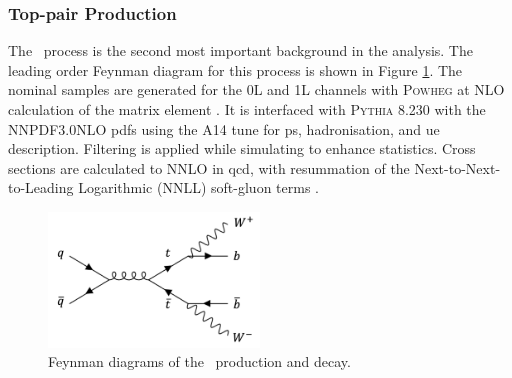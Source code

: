 \subsubsection{Top-pair Production}\label{subsec-vh-top-samples}
The \ttb\ process is the second most important background in the analysis. The leading order Feynman diagram for this process is shown in Figure \ref{fig:feynttb}. The nominal samples are generated for the 0L and 1L channels with \textsc{Powheg} at NLO calculation of the matrix element \cite{StefanoFrixione_2007, PaoloNason_2004}. It is interfaced with \textsc{Pythia} 8.230 with the NNPDF3.0NLO \glspl{pdf} using the A14 tune for \gls{ps}, hadronisation, and \gls{ue} description. Filtering is applied while simulating to enhance statistics. Cross sections are calculated to NNLO in \gls{qcd}, with resummation of the Next-to-Next-to-Leading Logarithmic (NNLL) soft-gluon terms \cite{CZAKON20142930}.

\begin{figure}[h!]
  \center
  \includegraphics[width=0.5\textwidth]{Images/VH/Feynman/ttb.png}
  \caption{Feynman diagrams of the \ttb\ production and decay.} 
  \label{fig:feynttb}
\end{figure}

